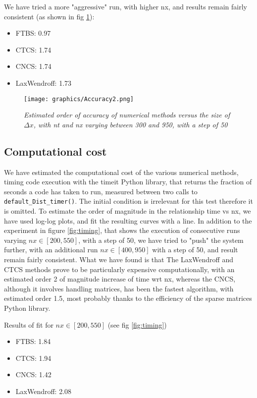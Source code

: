 We have tried a more "aggressive" run, with higher nx, and results remain fairly consistent (as shown in fig \ref{fig:orderofacc2}):
\begin{itemize}
	\item FTBS: 0.97
	\item CTCS: 1.74
	\item CNCS: 1.74
	\item LaxWendroff: 1.73
\end{itemize}

\begin{figure}[H]
	\begin{center}
		\texttt{[image: graphics/Accuracy2.png]}
	\end{center}%
	\caption[Order of accuracy of numerical methods]{ \em Estimated order of accuracy of numerical methods versus the size of $\Delta x$, with nt and nx varying between 300 and 950, with a step of 50}
	\label{fig:orderofacc2}
\end{figure}


\subsection{Computational cost}
\label{sec:compcost}
We have estimated the computational cost of the various numerical methods, timing code execution with the timeit Python library, that returns the fraction of seconds a code has taken to run, measured between two calls to \texttt{default\_Dist\_timer()}. The initial condition is irrelevant for this test therefore it is omitted.
To estimate the order of magnitude in the relationship time vs nx, we have used log-log plots, and fit the resulting curves with a line. In addition to the experiment in figure \ref{fig:timing}, that shows the execution of consecutive runs varying $nx\in [200, 550]$, with a step of 50, we have tried to "push" the system further, with an additional run $nx\in [400, 950]$ with a step of 50, and result remain fairly consistent.
What we have found is that The LaxWendroff and CTCS methods prove to be particularly expensive computationally, with an estimated order 2 of magnitude increase of time wrt nx, whereas the CNCS, although it involves handling matrices, has been the fastest algorithm, with estimated order 1.5, most probably thanks to the efficiency of the sparse matrices Python library.

Results of fit for $nx\in [200, 550]$ (see fig \ref{fig:timing})
\begin{itemize}
	\item FTBS: 1.84
	\item CTCS: 1.94
	\item CNCS: 1.42
	\item LaxWendroff: 2.08
\end{itemize}

